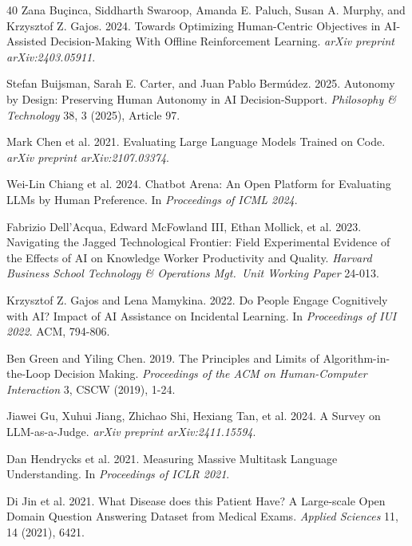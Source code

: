 \documentclass{article}
\begin{document}
\begin{thebibliography}{40}
Zana Bu\c{c}inca, Siddharth Swaroop, Amanda E. Paluch, Susan A. Murphy, and Krzysztof Z. Gajos. 2024.
\newblock Towards Optimizing Human-Centric Objectives in AI-Assisted Decision-Making With Offline Reinforcement Learning.
\newblock \textit{arXiv preprint arXiv:2403.05911}.

Stefan Buijsman, Sarah E. Carter, and Juan Pablo Berm\'{u}dez. 2025.
\newblock Autonomy by Design: Preserving Human Autonomy in AI Decision-Support.
\newblock \textit{Philosophy \& Technology} 38, 3 (2025), Article 97.

Mark Chen et al. 2021.
\newblock Evaluating Large Language Models Trained on Code.
\newblock \textit{arXiv preprint arXiv:2107.03374}.

Wei-Lin Chiang et al. 2024.
\newblock Chatbot Arena: An Open Platform for Evaluating LLMs by Human Preference.
\newblock In \textit{Proceedings of ICML 2024}.

Fabrizio Dell'Acqua, Edward McFowland III, Ethan Mollick, et al. 2023.
\newblock Navigating the Jagged Technological Frontier: Field Experimental Evidence of the Effects of AI on Knowledge Worker Productivity and Quality.
\newblock \textit{Harvard Business School Technology \& Operations Mgt.\ Unit Working Paper} 24-013.

Krzysztof Z. Gajos and Lena Mamykina. 2022.
\newblock Do People Engage Cognitively with AI? Impact of AI Assistance on Incidental Learning.
\newblock In \textit{Proceedings of IUI 2022}. ACM, 794-806.

Ben Green and Yiling Chen. 2019.
\newblock The Principles and Limits of Algorithm-in-the-Loop Decision Making.
\newblock \textit{Proceedings of the ACM on Human-Computer Interaction} 3, CSCW (2019), 1-24.

Jiawei Gu, Xuhui Jiang, Zhichao Shi, Hexiang Tan, et al. 2024.
\newblock A Survey on LLM-as-a-Judge.
\newblock \textit{arXiv preprint arXiv:2411.15594}.

Dan Hendrycks et al. 2021.
\newblock Measuring Massive Multitask Language Understanding.
\newblock In \textit{Proceedings of ICLR 2021}.

Di Jin et al. 2021.
\newblock What Disease does this Patient Have? A Large-scale Open Domain Question Answering Dataset from Medical Exams.
\newblock \textit{Applied Sciences} 11, 14 (2021), 6421.


\end{thebibliography}
\end{document}
